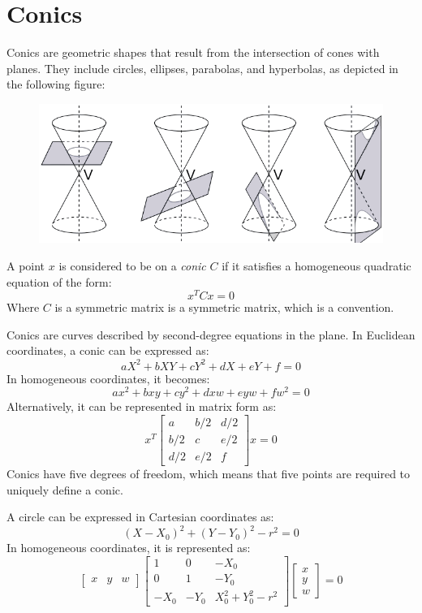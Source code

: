 \documentclass[12pt, a4paper]{report}
\begin{document}
    \section{Conics}
    Conics are geometric shapes that result from the intersection of cones with planes. 
    They include circles, ellipses, parabolas, and hyperbolas, as depicted in the following figure:
    \begin{figure}[H]
        \centering
        \includegraphics[width=0.5\linewidth]{images/conics.png}
    \end{figure}
    \begin{definition}
        A point $x$ is considered to be on a \emph{conic} $C$ if it satisfies a homogeneous quadratic equation of the form:
        \[x^TCx=0\]
        Where $C$ is a symmetric matrix is a symmetric matrix, which is a convention.
    \end{definition}
    Conics are curves described by second-degree equations in the plane. 
    In Euclidean coordinates, a conic can be expressed as:
    \[aX^2+bXY+cY^2+dX+eY+f=0\]
    In homogeneous coordinates, it becomes:
    \[ax^2+bxy+cy^2+dxw+eyw+fw^2=0\]
    Alternatively, it can be represented in matrix form as:
    \[x^T \begin{bmatrix} a & b/2 & d/2 \\ b/2 & c & e/2 \\ d/2 & e/2 & f \end{bmatrix} x=0\]
    Conics have five degrees of freedom, which means that five points are required to uniquely define a conic.
    \begin{example}
        A circle can be expressed in Cartesian coordinates as:
        \[(X-X_0)^2+(Y-Y_0)^2-r^2=0\]
        In homogeneous coordinates, it is represented as:
        \[  \begin{bmatrix} x & y & w \end{bmatrix}
            \begin{bmatrix} 1 & 0 & -X_0 \\ 0 & 1 & -Y_0 \\ -X_0 & -Y_0 & X_0^2+Y_0^2-r^2 \end{bmatrix}
            \begin{bmatrix} x \\ y \\ w \end{bmatrix} = 0
        \]
    \end{example}
\end{document}
